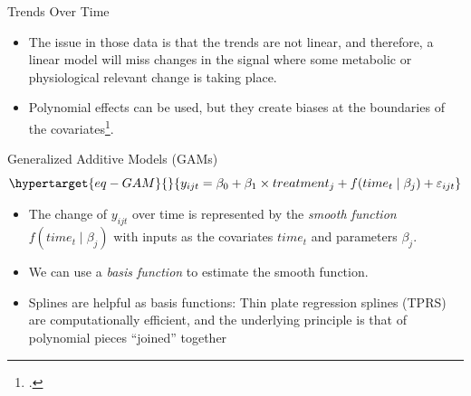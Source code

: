 \documentclass[
  ignorenonframetext,
]{beamer}
\providecommand{\tightlist}{%
  \setlength{\itemsep}{0pt}\setlength{\parskip}{0pt}}\usepackage{longtable,booktabs,array}
\begin{document}
\begin{frame}{Trends Over Time}
\protect\hypertarget{trends-over-time-1}{}
\begin{itemize}[<+->]
\item
  The issue in those data is that the trends are not linear, and
  therefore, a linear model will miss changes in the signal where some
  metabolic or physiological relevant change is taking place.
\item
  Polynomial effects can be used, but they create biases at the
  boundaries of the covariates\footcite{beck1998}.
\end{itemize}
\end{frame}

\begin{frame}{Generalized Additive Models (GAMs)}
\protect\hypertarget{generalized-additive-models-gams}{}
\begin{equation}\protect\hypertarget{eq-GAM}{}{
y_{ijt}=\beta_0+ \beta_1 \times treatment_j+f(time_t\mid \beta_j)+\varepsilon_{ijt}
}\label{eq-GAM}\end{equation}

\begin{itemize}[<+->]
\tightlist
\item
  The change of \(y_{ijt}\) over time is represented by the \emph{smooth
  function} \(f(time_t\mid \beta_j)\) with inputs as the covariates
  \(time_t\) and parameters \(\beta_j\).
\end{itemize}

\pause

\begin{itemize}[<+->]
\tightlist
\item
  We can use a \emph{basis function} to estimate the smooth function.
\end{itemize}

\pause

\begin{itemize}[<+->]
\tightlist
\item
  Splines are helpful as basis functions: Thin plate regression splines
  (TPRS) are computationally efficient, and the underlying principle is
  that of polynomial pieces ``joined'' together
\end{itemize}
\end{frame}
\end{document}
